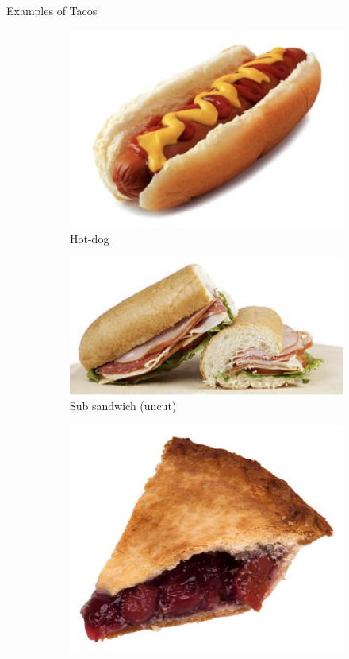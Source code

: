 \documentclass{beamer}
\begin{document}
\begin{frame}{Examples of Tacos}
    \begin{figure}
        \begin{subfigure}{.4\textwidth}
          \centering
          \includegraphics[width=.8\linewidth]{taco/20_hotdog.jpg}
          \caption{\label{fig:hot-dog-taco}Hot-dog}
        \end{subfigure}%
        \begin{subfigure}{.4\textwidth}
          \centering
          \includegraphics[width=.8\linewidth]{taco/20_sub.jpg}
          \caption{\label{fig:sub}Sub sandwich (uncut)}
        \end{subfigure}
        \begin{subfigure}{.5\textwidth}
          \centering
          \includegraphics[width=.6\linewidth]{taco/20_pie_slice.jpg}

\end{subfigure}
\end{figure}
\end{frame}
\end{document}
